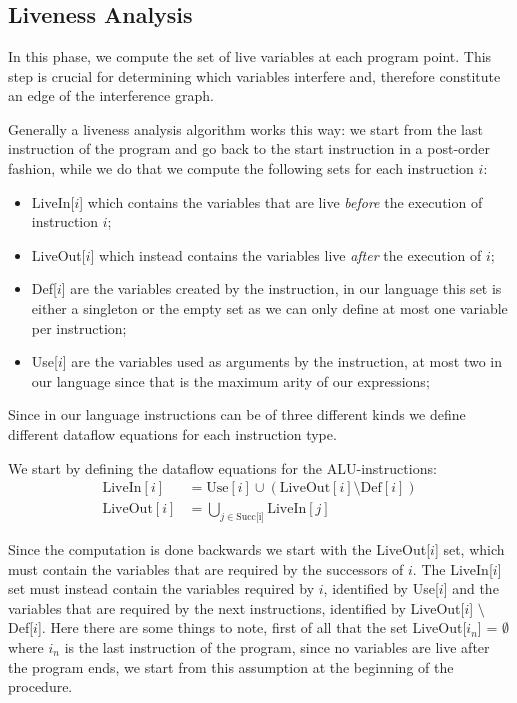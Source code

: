 
\chapter{}
\label{cha:ra}

\section{Liveness Analysis}
\label{sec:liveness}

In this phase, we compute the set of live variables at each program point. This step is crucial for determining which variables interfere and, therefore constitute an edge of the interference graph.

Generally a liveness analysis algorithm works this way:
we start from the last instruction of the program and go back to the start instruction in a post-order fashion, while we do that we compute the following sets for each instruction $i$:
\begin{itemize}
  \item LiveIn[$i$] which contains the variables that are live \textit{before} the execution of instruction $i$;
  \item LiveOut[$i$] which instead contains the variables live \textit{after} the execution of $i$;
  \item Def[$i$] are the variables created by the instruction, in our language this set is either a singleton or the empty set as we can only define at most one variable per instruction;
  \item Use[$i$] are the variables used as arguments by the instruction, at most two in our language since that is the maximum arity of our expressions;
\end{itemize}

Since in our language instructions can be of three different kinds we define different dataflow equations for each instruction type.

We start by defining the dataflow equations for the ALU-instructions:
\begin{align*}
  \text{LiveIn}[i] &= \text{Use}[i] \cup (\text{LiveOut}[i] \setminus \text{Def}[i]) \\
  \text{LiveOut}[i] &= \bigcup \limits_{j \in \text{Succ[i]}} \text{LiveIn}[j]
\end{align*}

Since the computation is done backwards we start with the LiveOut[$i$] set, which must contain the variables that are required by the successors of $i$. The
LiveIn[$i$] set must instead contain the variables required by $i$, identified by Use[$i$] and the variables that are required by the next instructions, identified by LiveOut[$i$] $\setminus$ Def[$i$].
Here there are some things to note, first of all that the set LiveOut[$i_n$] = $\emptyset$ where $i_n$ is the last instruction of the program, since no variables are live after the program ends, we start from this assumption at the beginning of the procedure.

